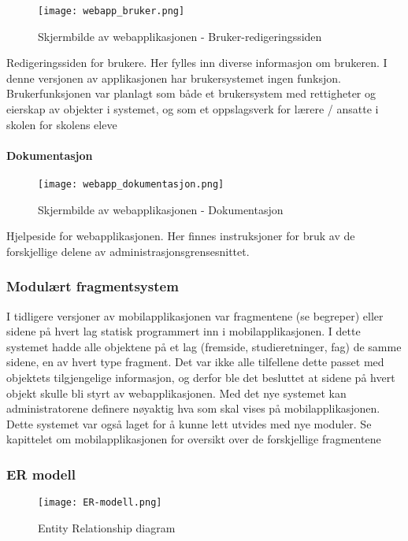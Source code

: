\documentclass[../main.tex]{subfiles}
\begin{document}
\begin{figure}[H]
  \centering
  \texttt{[image: webapp\_bruker.png]}
  \caption{Skjermbilde av webapplikasjonen - Bruker-redigeringssiden}
\end{figure}

Redigeringssiden for brukere. Her fylles inn diverse informasjon om brukeren. I denne versjonen av applikasjonen har brukersystemet ingen funksjon. Brukerfunksjonen var planlagt som både et brukersystem med rettigheter og eierskap av objekter i systemet, og som et oppslagsverk for lærere / ansatte i skolen for skolens eleve

\paragraph{Dokumentasjon}

\begin{figure}[H]
  \centering
  \texttt{[image: webapp\_dokumentasjon.png]}
  \caption{Skjermbilde av webapplikasjonen - Dokumentasjon}
\end{figure}

Hjelpeside for webapplikasjonen. Her finnes instruksjoner for bruk av de forskjellige delene av administrasjonsgrensesnittet.


\subsubsection{Modulært fragmentsystem}

I tidligere versjoner av mobilapplikasjonen var fragmentene (se begreper) eller sidene på hvert lag statisk programmert inn i mobilapplikasjonen. I dette systemet hadde alle objektene på et lag (fremside, studieretninger, fag) de samme sidene, en av hvert type fragment. Det var ikke alle tilfellene dette passet med objektets tilgjengelige informasjon, og derfor ble det besluttet at sidene på hvert objekt skulle bli styrt av webapplikasjonen. Med det nye systemet kan administratorene definere nøyaktig hva som skal vises på mobilapplikasjonen. Dette systemet var også laget for å kunne lett utvides med nye moduler. Se kapittelet om mobilapplikasjonen for oversikt over de forskjellige fragmentene

\subsubsection{ER modell}

\begin{figure}[H]
  \centering
  \texttt{[image: ER-modell.png]}
  \caption{Entity Relationship diagram}
\end{figure}
\end{document}
